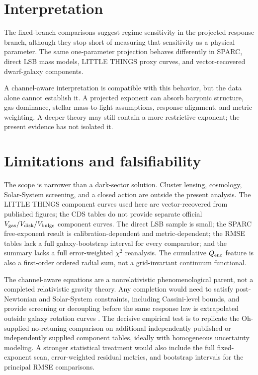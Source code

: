 ﻿\documentclass[twocolumn]{aastex631}
\begin{document}
\section{Interpretation}
The fixed-branch comparisons suggest regime sensitivity in the projected response branch, although they stop short of measuring that sensitivity as a physical parameter.  The same one-parameter projection behaves differently in SPARC, direct LSB mass models, LITTLE THINGS proxy curves, and vector-recovered dwarf-galaxy components.

A channel-aware interpretation is compatible with this behavior, but the data alone cannot establish it.  A projected exponent can absorb baryonic structure, gas dominance, stellar mass-to-light assumptions, response alignment, and metric weighting.  A deeper theory may still contain a more restrictive exponent; the present evidence has not isolated it.

\section{Limitations and falsifiability}
The scope is narrower than a dark-sector solution.  Cluster lensing, cosmology, Solar-System screening, and a closed action are outside the present analysis.  The LITTLE THINGS component curves used here are vector-recovered from published figures; the CDS tables do not provide separate official $V_{\rm gas}/V_{\rm disk}/V_{\rm bulge}$ component curves.  The direct LSB sample is small; the SPARC free-exponent result is calibration-dependent and metric-dependent; the RMSE tables lack a full galaxy-bootstrap interval for every comparator; and the summary lacks a full error-weighted $\chi^2$ reanalysis.  The cumulative $Q_{\rm enc}$ feature is also a first-order ordered radial sum, not a grid-invariant continuum functional.

The channel-aware equations are a nonrelativistic phenomenological parent, not a completed relativistic gravity theory.  Any completion would need to satisfy post-Newtonian and Solar-System constraints, including Cassini-level bounds, and provide screening or decoupling before the same response law is extrapolated outside galaxy rotation curves \citep{Bertotti2003,Will2014LRR,KhouryWeltman2004}.  The decisive empirical test is to replicate the Oh-supplied no-retuning comparison on additional independently published or independently supplied component tables, ideally with homogeneous uncertainty modeling.  A stronger statistical treatment would also include the full fixed-exponent scan, error-weighted residual metrics, and bootstrap intervals for the principal RMSE comparisons.
\end{document}
